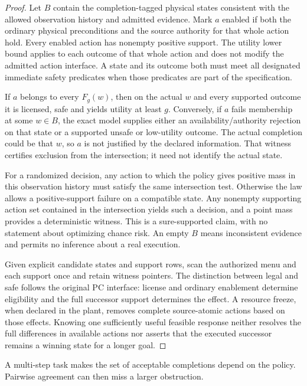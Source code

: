 \begin{proof}

Let \(B\) contain the completion-tagged physical states consistent with the allowed observation history and admitted evidence. Mark \(a\) enabled if both the ordinary physical preconditions and the source authority for that whole action hold. Every enabled action has nonempty positive support. The utility lower bound applies to each outcome of that whole action and does not modify the admitted action interface. A state and its outcome both must meet all designated immediate safety predicates when those predicates are part of the specification.

If \(a\) belongs to every \(F_g(w)\), then on the actual \(w\) and every supported outcome it is licensed, safe and yields utility at least \(g\). Conversely, if \(a\) fails membership at some \(w\in B\), the exact model supplies either an availability/authority rejection on that state or a supported unsafe or low-utility outcome. The actual completion could be that \(w\), so \(a\) is not justified by the declared information. That witness certifies exclusion from the intersection; it need not identify the actual state.

For a randomized decision, any action to which the policy gives positive mass in this observation history must satisfy the same intersection test. Otherwise the law allows a positive-support failure on a compatible state. Any nonempty supporting action set contained in the intersection yields such a decision, and a point mass provides a deterministic witness. This is a sure-supported claim, with no statement about optimizing chance risk. An empty \(B\) means inconsistent evidence and permits no inference about a real execution.

Given explicit candidate states and support rows, scan the authorized menu and each support once and retain witness pointers. The distinction between legal and safe follows the original PC interface: license and ordinary enablement determine eligibility and the full successor support determines the effect. A resource freeze, when declared in the plant, removes complete source-atomic actions based on those effects. Knowing one sufficiently useful feasible response neither resolves the full differences in available actions nor asserts that the executed successor remains a winning state for a longer goal.

\end{proof}

A multi-step task makes the set of acceptable completions depend on the policy. Pairwise agreement can then miss a larger obstruction.

